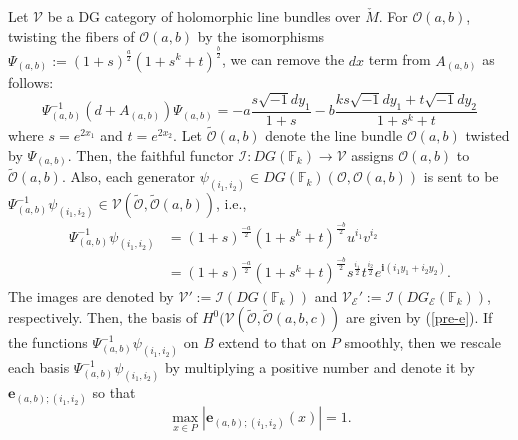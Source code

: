 \documentclass[12pt,reqno]{amsart}
\newcommand{\F}{{\mathbb{F}}}
\newcommand{\Fk}{{\F_k}}
\newcommand{\ii}{{\mathbf{i}}}
\newcommand{\ee}{{\mathbf{e}}}
\newcommand{\cO}{{\mathcal{O}}}
\newcommand{\cE}{{\mathcal{E}}}
\newcommand{\cI}{{\mathcal{I}}}
\newcommand{\cV}{{\mathcal{V}}}
\newcommand{\rt}{{\sqrt{-1}}}
\theoremstyle{definition}
\begin{document}
Let $\cV$ be a DG category of holomorphic line bundles over $\check{M}$. For $\cO(a,b)$, twisting the fibers of $\cO(a,b)$ by the isomorphisms $\Psi_{(a,b)}:=(1+s)^{\frac{a}{2}}(1+s^k+t)^{\frac{b}{2}}$, we can remove the $dx$ term from $A_{(a,b)}$ as follows:
\begin{equation*}
\Psi_{(a,b)}^{-1}(d+A_{(a,b)})\Psi_{(a,b)} = -a\frac{s\rt dy_1}{1+s}  -b\frac{ks\rt dy_1+t\rt dy_2}{1+s^k+t}
\end{equation*}
where $s=e^{2x_1}$ and $t=e^{2x_2}$.  Let $\widetilde{\cO}(a,b)$ denote the line bundle $\cO(a,b)$ twisted by $\Psi_{(a,b)}$. Then, the faithful functor $\cI:DG(\Fk)\to\cV$ assigns $\cO(a,b)$ to $\widetilde{\cO}(a,b)$. Also, each generator $\psi_{(i_1,i_2)}\in DG(\Fk)(\cO,\cO(a,b))$ is sent to be $\Psi^{-1}_{(a,b)}\psi_{(i_1,i_2)}\in\cV(\widetilde{\cO},\widetilde{\cO}(a,b))$, i.e.,
\begin{equation}\label{pre-e}
\begin{split}
\Psi^{-1}_{(a,b)}\psi_{(i_1,i_2)} &= (1+s)^{\frac{-a}{2}}(1+s^k+t)^{\frac{-b}{2}}u^{i_1}v^{i_2}\\
 &=(1+s)^\frac{-a}{2}(1 + s^k + t)^\frac{-b}{2}s^\frac{i_1}{2}t^\frac{i_2}{2}e^{\ii(i_1y_1 + i_2y_2)}.
\end{split}
\end{equation}
The images are denoted by $\cV':=\cI(DG(\Fk))$ and $\cV_\cE':=\cI(DG_\cE(\Fk))$, respectively. Then, the basis of $H^0(\cV(\widetilde{\cO},\widetilde{\cO}(a,b,c))$ are given by (\ref{pre-e}). If the functions $\Psi^{-1}_{(a,b)}\psi_{(i_1,i_2)}$ on $B$ extend to that on $P$ smoothly, then we rescale each basis $\Psi^{-1}_{(a,b)}\psi_{(i_1,i_2)}$ by multiplying a positive number and denote it by $\ee_{(a,b);(i_1,i_2)}$ so that
\begin{equation*}
\max_{x\in P}|\ee_{(a,b);(i_1,i_2)}(x)|=1.
\end{equation*}
\end{document}
